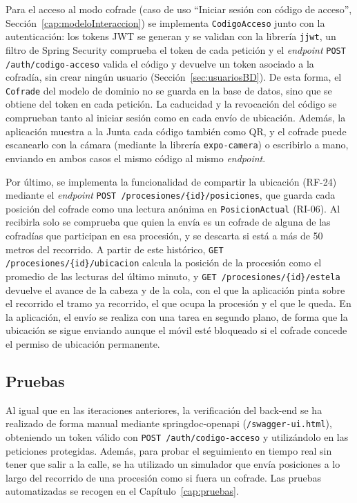 Para el acceso al modo cofrade (caso de uso ``Iniciar sesión con código de acceso'', Sección~\ref{cap:modeloInteraccion}) se implementa \texttt{CodigoAcceso} junto con la autenticación: los tokens JWT se generan y se validan con la librería \texttt{jjwt}, un filtro de Spring Security comprueba el token de cada petición y el \emph{endpoint} \texttt{POST /auth/codigo-acceso} valida el código y devuelve un token asociado a la cofradía, sin crear ningún usuario (Sección~\ref{sec:usuariosBD}). De esta forma, el \texttt{Cofrade} del modelo de dominio no se guarda en la base de datos, sino que se obtiene del token en cada petición. La caducidad y la revocación del código se comprueban tanto al iniciar sesión como en cada envío de ubicación. Además, la aplicación muestra a la Junta cada código también como QR, y el cofrade puede escanearlo con la cámara (mediante la librería \texttt{expo-camera}) o escribirlo a mano, enviando en ambos casos el mismo código al mismo \emph{endpoint}.

Por último, se implementa la funcionalidad de compartir la ubicación (RF-24) mediante el \emph{endpoint} \texttt{POST /procesiones/\{id\}/posiciones}, que guarda cada posición del cofrade como una lectura anónima en \texttt{PosicionActual} (RI-06). Al recibirla solo se comprueba que quien la envía es un cofrade de alguna de las cofradías que participan en esa procesión, y se descarta si está a más de 50 metros del recorrido. A partir de este histórico, \texttt{GET /procesiones/\{id\}/ubicacion} calcula la posición de la procesión como el promedio de las lecturas del último minuto, y \texttt{GET /procesiones/\{id\}/estela} devuelve el avance de la cabeza y de la cola, con el que la aplicación pinta sobre el recorrido el tramo ya recorrido, el que ocupa la procesión y el que le queda. En la aplicación, el envío se realiza con una tarea en segundo plano, de forma que la ubicación se sigue enviando aunque el móvil esté bloqueado si el cofrade concede el permiso de ubicación permanente.


\subsection{Pruebas}

Al igual que en las iteraciones anteriores, la verificación del back-end se ha realizado de forma manual mediante springdoc-openapi (\texttt{/swagger-ui.html}), obteniendo un token válido con \texttt{POST /auth/codigo-acceso} y utilizándolo en las peticiones protegidas. Además, para probar el seguimiento en tiempo real sin tener que salir a la calle, se ha utilizado un simulador que envía posiciones a lo largo del recorrido de una procesión como si fuera un cofrade. Las pruebas automatizadas se recogen en el Capítulo~\ref{cap:pruebas}.
